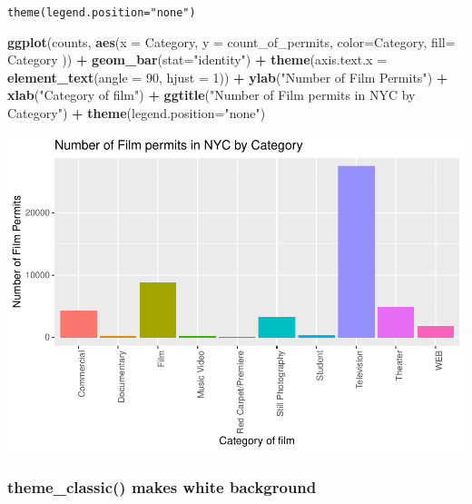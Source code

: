 \documentclass[
]{book}
\newenvironment{Shaded}{\begin{snugshade}}{\end{snugshade}}
\newcommand{\AttributeTok}[1]{\textcolor[rgb]{0.13,0.29,0.53}{#1}}
\newcommand{\DecValTok}[1]{\textcolor[rgb]{0.00,0.00,0.81}{#1}}
\newcommand{\FunctionTok}[1]{\textcolor[rgb]{0.13,0.29,0.53}{\textbf{#1}}}
\newcommand{\NormalTok}[1]{#1}
\newcommand{\SpecialCharTok}[1]{\textcolor[rgb]{0.81,0.36,0.00}{\textbf{#1}}}
\newcommand{\StringTok}[1]{\textcolor[rgb]{0.31,0.60,0.02}{#1}}
\begin{document}
\texttt{theme(legend.position="none")}

\begin{Shaded}
\begin{Highlighting}[]
\FunctionTok{ggplot}\NormalTok{(counts, }\FunctionTok{aes}\NormalTok{(}\AttributeTok{x =}\NormalTok{ Category, }\AttributeTok{y =}\NormalTok{ count\_of\_permits, }
                   \AttributeTok{color=}\NormalTok{Category, }
                   \AttributeTok{fill=}\NormalTok{ Category )) }\SpecialCharTok{+}
  \FunctionTok{geom\_bar}\NormalTok{(}\AttributeTok{stat=}\StringTok{"identity"}\NormalTok{) }\SpecialCharTok{+} 
  \FunctionTok{theme}\NormalTok{(}\AttributeTok{axis.text.x =} \FunctionTok{element\_text}\NormalTok{(}\AttributeTok{angle =} \DecValTok{90}\NormalTok{, }\AttributeTok{hjust =} \DecValTok{1}\NormalTok{)) }\SpecialCharTok{+}
  \FunctionTok{ylab}\NormalTok{(}\StringTok{"Number of Film Permits"}\NormalTok{) }\SpecialCharTok{+} 
  \FunctionTok{xlab}\NormalTok{(}\StringTok{"Category of film"}\NormalTok{) }\SpecialCharTok{+}
  \FunctionTok{ggtitle}\NormalTok{(}\StringTok{"Number of Film permits in NYC by Category"}\NormalTok{) }\SpecialCharTok{+}
  \FunctionTok{theme}\NormalTok{(}\AttributeTok{legend.position=}\StringTok{"none"}\NormalTok{)}
\end{Highlighting}
\end{Shaded}

\includegraphics{Statistics_Lab_files/figure-latex/1categoryH-1.pdf}

\hypertarget{theme_classic-makes-white-background}{%
\subsubsection{theme\_classic() makes white background}\label{theme_classic-makes-white-background}}
\end{document}
